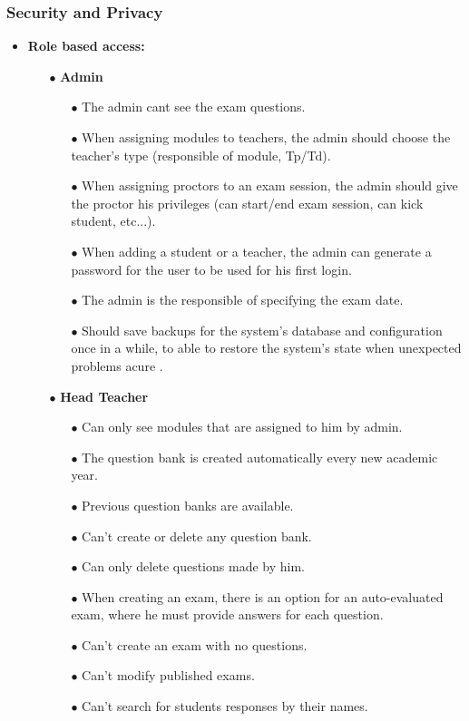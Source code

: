 \documentclass[]{uc2pfecaneva}
\begin{document}
    \raggedright\subsubsection{Security and Privacy}

    \begin{itemize}
        \item\textbf{Role based access:}
        \begin{itemize}
            \item[$\bullet$]\textbf{Admin}
            \begin{itemize}
                \item[$\bullet$] The admin cant see the exam questions.
                \item[$\bullet$] When assigning modules to teachers, the admin should choose the teacher’s type (responsible of module, Tp/Td).
                \item[$\bullet$] When assigning proctors to an exam session, the admin should give the proctor his privileges (can start/end exam session, can kick student, etc...).
                \item[$\bullet$] When adding a student or a teacher, the admin can generate a password for the user to be used for his first login.
                \item[$\bullet$] The admin is the responsible of specifying the exam date.
                \item[$\bullet$] Should save backups for the system’s database and configuration once in a while, to able to restore the system’s state when  unexpected problems acure .
            \end{itemize}

            \item[$\bullet$]\textbf{Head Teacher}
            \begin{itemize}
                \item[$\bullet$] Can only see modules that are assigned to him by admin.
                \item[$\bullet$] The question bank is created automatically every new academic year.
                \item[$\bullet$] Previous question banks are available.
                \item[$\bullet$] Can’t create or delete any question bank.
                \item[$\bullet$] Can only delete questions made by him.
                \item[$\bullet$] When creating an exam, there is an option for an auto-evaluated exam, where he must provide answers for each question.
                \item[$\bullet$] Can’t create an exam with no questions.
                \item[$\bullet$] Can’t modify published exams.
                \item[$\bullet$] Can’t search for students responses by their names.
            \end{itemize}


\end{itemize}
\end{itemize}
\end{document}

